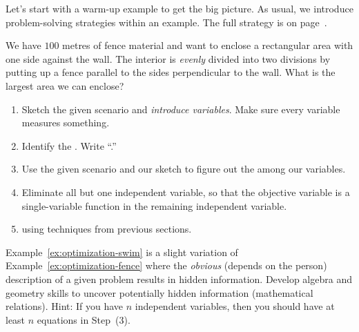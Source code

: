 \documentclass[../main.tex]{subfiles}
\begin{document}
  Let's start with a warm-up example to get the big picture. As usual, we introduce problem-solving strategies within an example. The full strategy is on page~\pageref{page:optimization-strategy}.
  \begin{example} \label{ex:optimization-fence}
    We have \(100\) metres of fence material and want to enclose a rectangular area with one side against the wall. The interior is \emph{evenly} divided into two divisions by putting up a fence parallel to the sides perpendicular to the wall. What is the largest area we can enclose?

    \begin{enumerate}
      \item Sketch the given scenario and \emph{introduce variables}. Make sure every variable measures something.

      \item Identify the . Write ``\emph{}.''

      \item Use the given scenario and our sketch to figure out the  among our variables. 

      \item Eliminate all but one independent variable, so that the objective variable is a single-variable function in the remaining independent variable. 

      \item {} using techniques from previous sections.
    \end{enumerate}
  \end{example}
  \clearpage

  Example~\ref{ex:optimization-swim} is a slight variation of Example~\ref{ex:optimization-fence} where the \emph{obvious} (depends on the person) description of a given problem results in hidden information. Develop algebra and geometry skills to uncover potentially hidden information (mathematical relations). Hint: If you have \(n\) independent variables, then you should have at least \(n\) equations in Step~(3).
\end{document}
